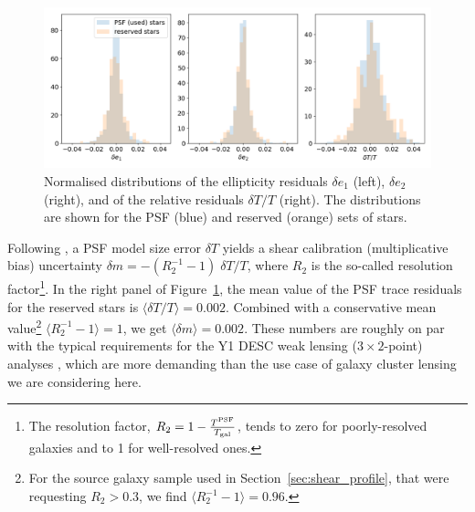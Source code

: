 \documentclass[SE,lsstdraft,authoryear,toc]{lsstdoc}
\begin{document}
\begin{figure}
\includegraphics[width=\textwidth]{Figures/residual_histograms.png}
\caption{Normalised distributions of the ellipticity residuals $\delta e_1$ (left), $\delta e_2$ (right), and of the relative residuals $\delta T/T$ (right). The distributions are shown for the PSF (blue) and reserved (orange) sets of stars. \label{fig:residual_distrib}}
\end{figure}

Following \citet{2004MNRAS.353..529H, 2018PASJ...70S..25M}, a PSF model size error $\delta T$ yields a shear calibration (multiplicative bias) uncertainty $\delta m = -(R_2^{-1} -1)\; \delta T/T$, where $R_2$ is the so-called resolution factor\footnote{The resolution factor, $R_2 = 1 -\frac{T^{\rm PSF}}{T_{\rm gal}}$, tends to zero for poorly-resolved galaxies and to 1 for well-resolved ones.}. In the right panel of Figure~\ref{fig:residual_distrib}, the mean value of the PSF trace residuals for the reserved stars is $\langle \delta T/T \rangle = 0.002$. Combined with a conservative mean value\footnote{For the source galaxy sample used in Section~\ref{sec:shear_profile}, that were requesting $R_2 > 0.3$, we find $\langle R_2^{-1} -1 \rangle = 0.96$.} 
$\langle R_2^{-1} -1 \rangle = 1$, we get $\langle \delta m \rangle = 0.002$. These numbers are roughly on par with the typical requirements for the Y1 DESC weak lensing ($3 \times 2$-point) analyses \citep{2018arXiv180901669T}, which are more demanding than the use case of galaxy cluster lensing we are considering here.
\end{document}
